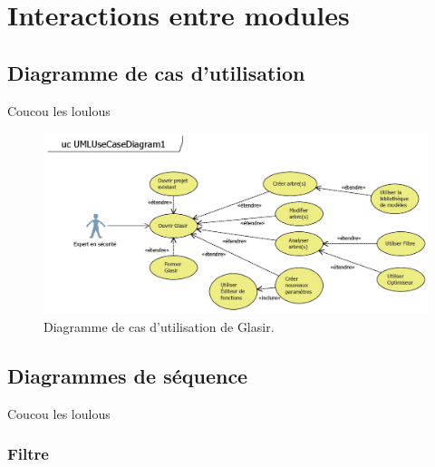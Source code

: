 \section{Interactions entre modules}
    \label{sec:interactions}
    
    \subsection{Diagramme de cas d'utilisation}
    	Coucou les loulous

    \begin{figure}[H]
        \centering
        \includegraphics[height=0.5\textwidth]{figure/UseCaseDiagram.png}
        \caption{Diagramme de cas d'utilisation de Glasir.}
        \label{fig:use_case}
    \end{figure}
    
	\subsection{Diagrammes de séquence}
    	Coucou les loulous

		\subsubsection{Filtre}

